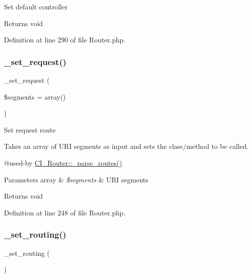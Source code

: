 Set default controller

\begin{DoxyReturn}{Returns}
void 
\end{DoxyReturn}


Definition at line 290 of file Router.\+php.

\mbox{\label{class_c_i___router_a92b8b486926e4dea5fee4d71f80a472a}} 
\subsubsection{\texorpdfstring{\_set\_request()}{\_set\_request()}}
{\footnotesize\ttfamily \+\_\+set\+\_\+request (\begin{DoxyParamCaption}\item[{}]{\$segments = {\ttfamily array()} }\end{DoxyParamCaption})\hspace{0.3cm}{\ttfamily [protected]}}

Set request route

Takes an array of U\+RI segments as input and sets the class/method to be called.

@used-\/by \mbox{\hyperlink{class_c_i___router_a55a42fae865d03334b49baa5a5a6bd0b}{C\+I\+\_\+\+Router\+::\+\_\+parse\+\_\+routes()}} 
\begin{DoxyParams}[1]{Parameters}
array & {\em \$segments} & U\+RI segments \\
\hline
\end{DoxyParams}
\begin{DoxyReturn}{Returns}
void 
\end{DoxyReturn}


Definition at line 248 of file Router.\+php.

\mbox{\label{class_c_i___router_abc9f3e0d48cec66f93a7f103c9a65892}} 
\subsubsection{\texorpdfstring{\_set\_routing()}{\_set\_routing()}}
{\footnotesize\ttfamily \+\_\+set\+\_\+routing (\begin{DoxyParamCaption}{ }\end{DoxyParamCaption})\hspace{0.3cm}{\ttfamily [protected]}}

